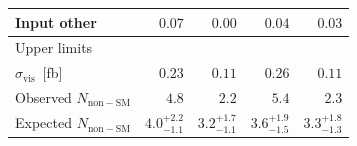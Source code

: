 \begin{table}
\begin{center}
\begin{tabular}{lrrrr}
      Input other                    & $0.07$                & $0.00$                & $0.04$                & $0.03$             \\
      \midrule
      Upper limits \\
      \midrule
      $\sigma_\mathrm{vis}$~[fb]     & $0.23$                & $0.11$                & $0.26$                & $0.11$                \\[1ex]
      Observed $N_\mathrm{non-SM}$   & $4.8$                 & $2.2$                 & $5.4$                 & $2.3$                 \\[1ex]
      Expected $N_\mathrm{non-SM}$   & ${4.0}^{+2.2}_{-1.1}$ & ${3.2}^{+1.7}_{-1.1}$ & ${3.6}^{+1.9}_{-1.5}$ & ${3.3}^{+1.8}_{-1.3}$ \\
      \bottomrule
    \end{tabular}
  \end{center}
\end{table}

